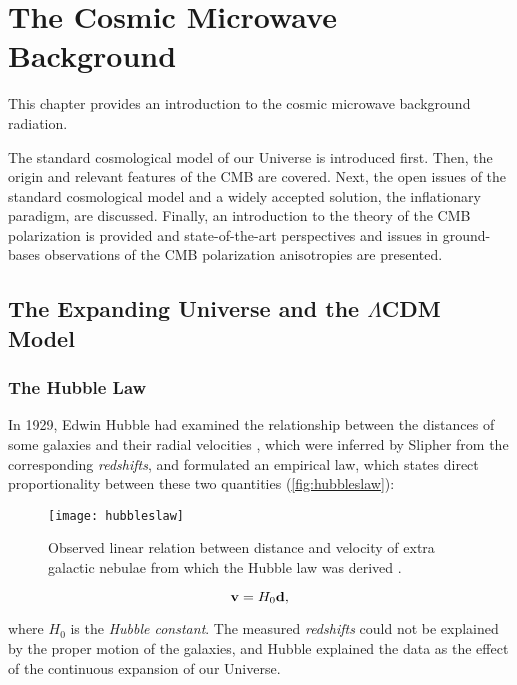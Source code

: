 \chapter{The Cosmic Microwave Background}\label{ch:cmb}

This chapter provides an introduction to the cosmic microwave background
radiation.

The standard cosmological model of our Universe is introduced first. Then,
the origin and relevant features of the CMB are covered. Next, the open
issues of the standard cosmological model and a widely accepted solution,
the inflationary paradigm, are discussed.  Finally, an introduction to the
theory of the CMB polarization is provided and state-of-the-art
perspectives and issues in ground-bases observations of the CMB
polarization anisotropies are presented.

\section{The Expanding Universe and the \texorpdfstring{$\Lambda$}{LAMBDA-}CDM Model}
\subsection{The Hubble Law}\label{ss:hubbleslaw}

In 1929, Edwin Hubble had examined the relationship between the distances
of some galaxies and their radial velocities \autocite{hubble1929relation},
which were inferred by Slipher
\autocite{slipher1913radial}\autocite{slipher1915spectrographic} from the
corresponding \emph{redshifts}, and formulated an empirical law, which
states direct proportionality between these two quantities
(\autoref{fig:hubbleslaw}):

\begin{figure}
        \centering
        \texttt{[image: hubbleslaw]}
        \caption{Observed linear relation between distance and velocity of extra
        galactic nebulae from which the Hubble law was derived
        \autocite{hubble1929relation}.}
        \label{fig:hubbleslaw}
\end{figure}

\begin{equation}\label{eq:hubble_law}
        \vb{v} = H_0 \vb{d},
\end{equation}

where $H_0$ is the \emph{Hubble constant}.
The measured \emph{redshifts} could not be explained by the proper motion
of the galaxies, and Hubble explained the data as the effect of the
continuous expansion of our Universe.

